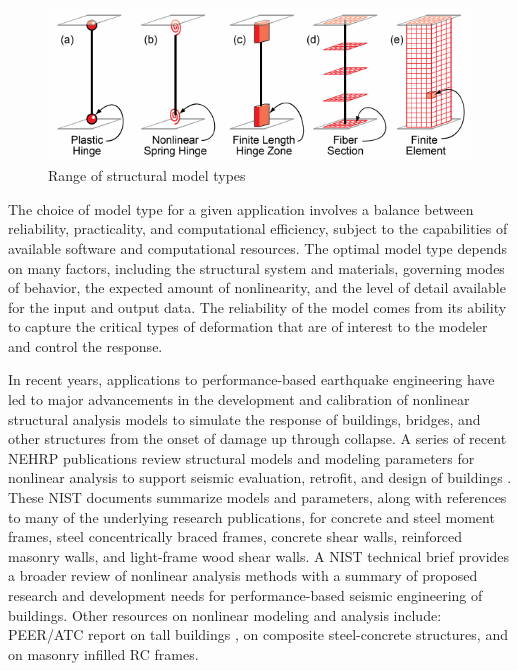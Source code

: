 \begin{figure}[htb]
    \centering
    \includegraphics[width=1.0\textwidth, angle = 0]{Figures/ModelTypes.pdf}
    \caption{Range of structural model types \citep{deierlein2010nonlinear}}
    \label{fig:response_ModelTypes}
\end{figure}

The choice of model type for a given application involves a balance between reliability, practicality, and computational efficiency, subject to the capabilities of available software and computational resources. The optimal model type depends on many factors, including the structural system and materials, governing modes of behavior, the expected amount of nonlinearity, and the level of detail available for the input and output data. The reliability of the model comes from its ability to capture the critical types of deformation that are of interest to the modeler and control the response. 

In recent years, applications to performance-based earthquake engineering have led to major advancements in the development and calibration of nonlinear structural analysis models to simulate the response of buildings, bridges, and other structures from the onset of damage up through collapse. A series of recent NEHRP publications review structural models and modeling parameters for nonlinear analysis to support seismic evaluation, retrofit, and design of buildings \citep{nist2017guidelines,nist2017guidelinesa,nist2017guidelinesb}. These NIST documents summarize models and parameters, along with references to many of the underlying research publications, for concrete and steel moment frames, steel concentrically braced frames, concrete shear walls, reinforced masonry walls, and light-frame wood shear walls. A NIST technical brief \citep{deierlein2010nonlinear} provides a broader review of nonlinear analysis methods with a summary of proposed research and development needs for performance-based seismic engineering of buildings. Other resources on nonlinear modeling and analysis include: PEER/ATC report on tall buildings \citep{malley2010modeling}, \cite{spacone2004nonlinear} on composite steel-concrete structures, and \cite{nurbaiah2017modelling} on masonry infilled RC frames.

